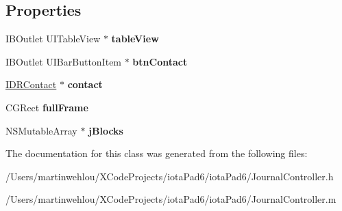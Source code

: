 \subsection*{Properties}
\begin{DoxyCompactItemize}
\item 
\hypertarget{interface_journal_controller_a1281ee2e0e3d2cbbf18c949fcfefe501}{
IBOutlet UITableView $\ast$ {\bfseries tableView}}
\label{interface_journal_controller_a1281ee2e0e3d2cbbf18c949fcfefe501}

\item 
\hypertarget{interface_journal_controller_a901c8e4fb8b3cc908c5308b4256808cb}{
IBOutlet UIBarButtonItem $\ast$ {\bfseries btnContact}}
\label{interface_journal_controller_a901c8e4fb8b3cc908c5308b4256808cb}

\item 
\hypertarget{interface_journal_controller_ac61b551e4a1020d399eabbc3623b6e1d}{
\hyperlink{interface_i_d_r_contact}{IDRContact} $\ast$ {\bfseries contact}}
\label{interface_journal_controller_ac61b551e4a1020d399eabbc3623b6e1d}

\item 
\hypertarget{interface_journal_controller_a1567a25ad63304e89b0052448a7d0643}{
CGRect {\bfseries fullFrame}}
\label{interface_journal_controller_a1567a25ad63304e89b0052448a7d0643}

\item 
\hypertarget{interface_journal_controller_adec7dddeaa08aff56b3fdce5ef5e6a3d}{
NSMutableArray $\ast$ {\bfseries jBlocks}}
\label{interface_journal_controller_adec7dddeaa08aff56b3fdce5ef5e6a3d}

\end{DoxyCompactItemize}


The documentation for this class was generated from the following files:\begin{DoxyCompactItemize}
\item 
/Users/martinwehlou/XCodeProjects/iotaPad6/iotaPad6/JournalController.h\item 
/Users/martinwehlou/XCodeProjects/iotaPad6/iotaPad6/JournalController.m\end{DoxyCompactItemize}
